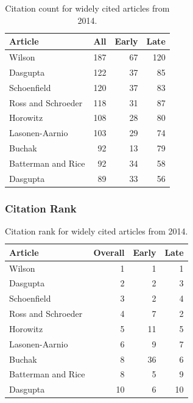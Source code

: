 \documentclass[
  10pt,
  letterpaper,
  DIV=11,
  numbers=noendperiod,
  twoside]{scrartcl}
\begin{document}
\begin{longtable}[]{@{}lrrr@{}}

\caption{\label{tbl-citation-count-2014}Citation count for widely cited
articles from 2014.}

\tabularnewline

\toprule\noalign{}
Article & All & Early & Late \\
\midrule\noalign{}
\endhead
\bottomrule\noalign{}
\endlastfoot
Wilson & 187 & 67 & 120 \\
Dasgupta & 122 & 37 & 85 \\
Schoenfield & 120 & 37 & 83 \\
Ross and Schroeder & 118 & 31 & 87 \\
Horowitz & 108 & 28 & 80 \\
Lasonen-Aarnio & 103 & 29 & 74 \\
Buchak & 92 & 13 & 79 \\
Batterman and Rice & 92 & 34 & 58 \\
Dasgupta & 89 & 33 & 56 \\

\end{longtable}

\subsubsection*{Citation Rank}\label{sec-rank-2014}

\begin{longtable}[]{@{}lrrr@{}}

\caption{\label{tbl-citation-rank-2014}Citation rank for widely cited
articles from 2014.}

\tabularnewline

\toprule\noalign{}
Article & Overall & Early & Late \\
\midrule\noalign{}
\endhead
\bottomrule\noalign{}
\endlastfoot
Wilson & 1 & 1 & 1 \\
Dasgupta & 2 & 2 & 3 \\
Schoenfield & 3 & 2 & 4 \\
Ross and Schroeder & 4 & 7 & 2 \\
Horowitz & 5 & 11 & 5 \\
Lasonen-Aarnio & 6 & 9 & 7 \\
Buchak & 8 & 36 & 6 \\
Batterman and Rice & 8 & 5 & 9 \\
Dasgupta & 10 & 6 & 10 \\

\end{longtable}
\end{document}
